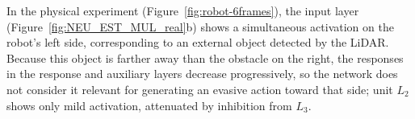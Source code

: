 
In the physical experiment (Figure~\ref{fig:robot-6frames}), the input layer (Figure~\ref{fig:NEU_EST_MUL_real}b) shows a simultaneous activation on the robot's left side, corresponding to an external object detected by the LiDAR. Because this object is farther away than the obstacle on the right, the responses in the response and auxiliary layers decrease progressively, so the network does not consider it relevant for generating an evasive action toward that side; unit $L_2$ shows only mild activation, attenuated by inhibition from $L_3$.
